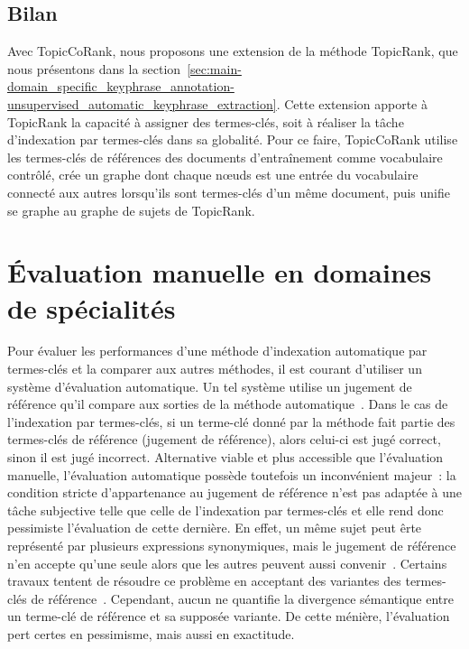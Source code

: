     \subsection{Bilan}
    \label{subsec:main-domain_specific_keyphrase_annotation-supervised_automatic_keyphrase_annotation-conclusion}
      Avec TopicCoRank, nous proposons une extension de la méthode TopicRank,
      que nous présentons dans la
      section~\ref{sec:main-domain_specific_keyphrase_annotation-unsupervised_automatic_keyphrase_extraction}.
      Cette extension apporte à TopicRank la capacité à assigner des
      termes-clés, soit à réaliser la tâche d'indexation par termes-clés dans sa
      globalité. Pour ce faire, TopicCoRank utilise les termes-clés de
      références des documents d'entraînement comme vocabulaire contrôlé, crée
      un graphe dont chaque n\oe{}uds est une entrée du vocabulaire connecté aux
      autres lorsqu'ils sont termes-clés d'un même document, puis unifie se
      graphe au graphe de sujets de TopicRank.


  \section{Évaluation manuelle en domaines de spécialités}
  \label{sec:main-domain_specific_keyphrase_annotation-manual_evaluation}
    Pour évaluer les performances d'une méthode d'indexation automatique par
    termes-clés et la comparer aux autres méthodes, il est courant d'utiliser un
    système d'évaluation automatique. Un tel système utilise un jugement de
    référence qu'il compare aux sorties de la méthode
    automatique~\cite{voorhees2002philosophy}. Dans le cas de l'indexation par
    termes-clés, si un terme-clé donné par la méthode fait partie des
    termes-clés de référence (jugement de référence), alors celui-ci est jugé
    correct, sinon il est jugé incorrect. Alternative viable et plus accessible
    que l'évaluation manuelle, l'évaluation automatique possède toutefois un
    inconvénient majeur~: la condition stricte d'appartenance au jugement de
    référence n'est pas adaptée à une tâche subjective telle que celle de
    l'indexation par termes-clés et elle rend donc pessimiste l'évaluation de
    cette dernière. En effet, un même sujet peut êrte représenté par plusieurs
    expressions synonymiques, mais le jugement de référence n'en accepte qu'une
    seule alors que les autres peuvent aussi
    convenir~\cite{hasan2014state_of_the_art}. Certains travaux tentent de
    résoudre ce problème en acceptant des variantes des termes-clés de
    référence~\cite{zesch2009rprecision,kim2010rprecision}. Cependant, aucun ne
    quantifie la divergence sémantique entre un terme-clé de référence et sa
    supposée variante. De cette ménière, l'évaluation pert certes en pessimisme,
    mais aussi en exactitude.
    
